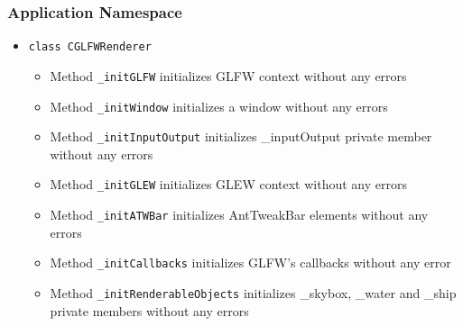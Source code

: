 \documentclass{report}
\begin{document}
\subsubsection{Application Namespace}
\begin{itemize}
	
%
%
\item \texttt{class CGLFWRenderer}
		\begin{itemize}
			\item Method \texttt{\_initGLFW} initializes GLFW context without any errors
			\item Method \texttt{\_initWindow} initializes a window without any errors
			\item Method \texttt{\_initInputOutput} initializes \_inputOutput private member without any errors
			\item Method \texttt{\_initGLEW} initializes GLEW context without any errors
			\item Method \texttt{\_initATWBar} initializes AntTweakBar elements without any errors
			\item Method \texttt{\_initCallbacks} initializes GLFW's callbacks without any error
			\item Method \texttt{\_initRenderableObjects} initializes \_skybox,  \_water and \_ship private members without any errors
		\end{itemize}
		

\end{itemize}
\end{document}
